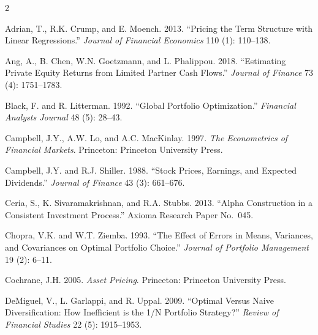 \documentclass[pdftex,12pt,a4paper]{article}
\begin{document}
\footnotesize
\setlength{\bibsep}{2pt}
\begin{multicols}{2}
\raggedright
\begin{thebibliography}{}

	Adrian, T., R.K. Crump, and E. Moench. 2013. ``Pricing the Term Structure with Linear Regressions.'' \textit{Journal of Financial Economics} 110 (1): 110--138.

	Ang, A., B. Chen, W.N. Goetzmann, and L. Phalippou. 2018. ``Estimating Private Equity Returns from Limited Partner Cash Flows.'' \textit{Journal of Finance} 73 (4): 1751--1783.

	Black, F. and R. Litterman. 1992. ``Global Portfolio Optimization.'' \textit{Financial Analysts Journal} 48 (5): 28--43.

	Campbell, J.Y., A.W. Lo, and A.C. MacKinlay. 1997. \textit{The Econometrics of Financial Markets}. Princeton: Princeton University Press.

	Campbell, J.Y. and R.J. Shiller. 1988. ``Stock Prices, Earnings, and Expected Dividends.'' \textit{Journal of Finance} 43 (3): 661--676.

	Ceria, S., K. Sivaramakrishnan, and R.A. Stubbs. 2013. ``Alpha Construction in a Consistent Investment Process.'' Axioma Research Paper No.~045.

	Chopra, V.K. and W.T. Ziemba. 1993. ``The Effect of Errors in Means, Variances, and Covariances on Optimal Portfolio Choice.'' \textit{Journal of Portfolio Management} 19 (2): 6--11.

	Cochrane, J.H. 2005. \textit{Asset Pricing}. Princeton: Princeton University Press.

	DeMiguel, V., L. Garlappi, and R. Uppal. 2009. ``Optimal Versus Naive Diversification: How Inefficient is the 1/N Portfolio Strategy?'' \textit{Review of Financial Studies} 22 (5): 1915--1953.


\end{thebibliography}
\end{multicols}
\end{document}
